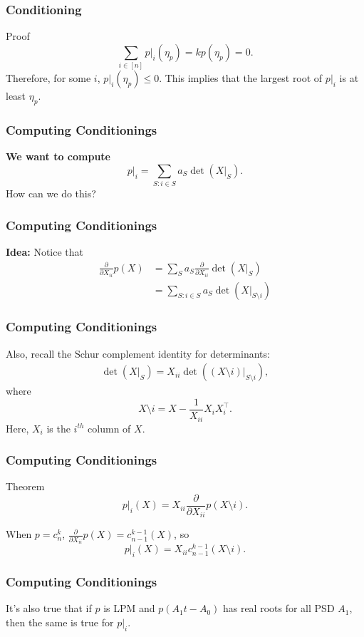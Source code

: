\documentclass{beamer}
\begin{document}
\begin{frame}
    \frametitle{Conditioning}
    \begin{block}{Proof}
    \[
        \sum_{i\in [n]}p|_i(\eta_p) = kp(\eta_p) = 0.
    \]
    \pause
    Therefore, for some $i$, $ p|_{i}(\eta_{p}) \le 0$.
    \pause
    This implies that the largest root of $p|_{i}$ is at least $\eta_{p}$.
    \end{block}
\end{frame}
\begin{frame}
    \frametitle{Computing Conditionings}
    \textbf{We want to compute}
    \[
        p|_i = \sum_{S : i \in S} a_S \det(X|_S).
    \]
    How can we do this?
\end{frame}
\begin{frame}
    \frametitle{Computing Conditionings}
    \textbf{Idea: } Notice that
    \begin{align*}
        \frac{\partial}{\partial X_{ii}} p(X) &= \sum_{S} a_S \frac{\partial}{\partial X_{ii}}  \det(X|_{S})\\
                               &= \sum_{S : i \in S} a_S \det(X|_{S \setminus i})
    \end{align*}
\end{frame}
\begin{frame}
    \frametitle{Computing Conditionings}
    Also, recall the Schur complement identity for determinants:
    \begin{align*}
        \det(X|_S) = X_{ii} \det((X \setminus i)|_{S \setminus i}),
    \end{align*}
    where 
    \[
        X \setminus i = X - \frac{1}{X_{ii}} X_i X_i^{\intercal}.
    \]
    Here, $X_i$ is the $i^{th}$ column of $X$.
\end{frame}
\begin{frame}
    \frametitle{Computing Conditionings}
    \begin{block}{Theorem}
        \[
            p|_i(X) = X_{ii} \frac{\partial}{\partial X_{ii}} p(X \setminus i).
        \]
    \end{block}
    When $p = c_n^k$, $\frac{\partial}{\partial X_{ii}} p(X) = c_{n-1}^{k-1}(X)$, so 
    \[
        p|_i(X) = X_{ii} c_{n-1}^{k-1}(X \setminus i).
    \]
\end{frame}
\begin{frame}
    \frametitle{Computing Conditionings}
    It's also true that if $p$ is LPM and $p(A_1 t - A_0)$ has real roots for all PSD $A_1$, then the same is true for $p|_i$.
\end{frame}
\end{document}
